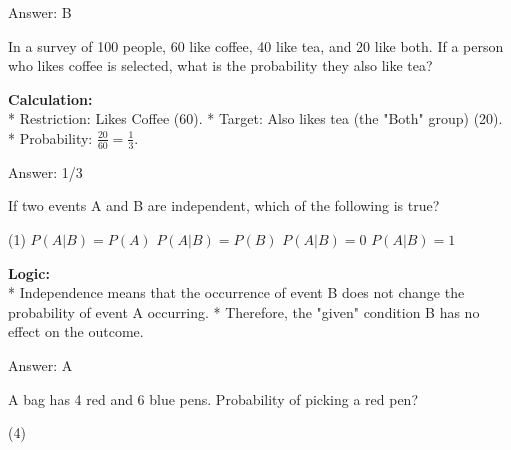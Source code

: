 \documentclass[11pt,paper=a4,answers]{exam}
\begin{document}
\begin{questions}
\begin{solution}
\vspace{30pt}

Answer: \colorbox{yellow!100}{B}
\end{solution}

\vspace{60pt}

\question
In a survey of 100 people, 60 like coffee, 40 like tea, and 20 like both. If a person who likes coffee is selected, what is the probability they also like tea?

\begin{solution}
\textbf{Calculation:} \\
* Restriction: Likes Coffee (60).
* Target: Also likes tea (the "Both" group) (20).
* Probability: $\frac{20}{60} = \frac{1}{3}$.

\vspace{30pt}

Answer: \colorbox{yellow!100}{1/3}
\end{solution}

\vspace{60pt}

\question
If two events A and B are independent, which of the following is true?
\begin{tasks}(1)
    \task $P(A|B) = P(A)$
    \task $P(A|B) = P(B)$
    \task $P(A|B) = 0$
    \task $P(A|B) = 1$
\end{tasks}

\begin{solution}
\textbf{Logic:} \\
* Independence means that the occurrence of event B does not change the probability of event A occurring.
* Therefore, the "given" condition B has no effect on the outcome.

\vspace{30pt}

Answer: \colorbox{yellow!100}{A}
\end{solution}

\vspace{60pt}

\question
A bag has 4 red and 6 blue pens. Probability of picking a red pen?
\begin{tasks}(4)
\end{tasks}


\end{questions}
\end{document}
